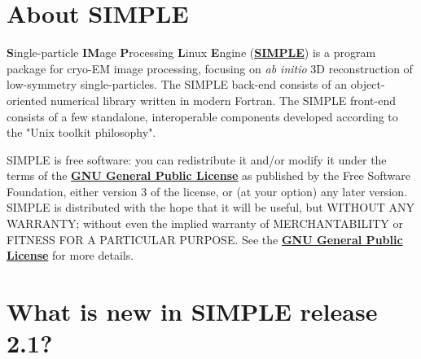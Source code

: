 \documentclass[a4paper,11pt]{article}
\begin{document}
\tableofcontents{}
\clearpage

\section{About SIMPLE}

\textbf{S}ingle-particle \textbf{IM}age \textbf{P}rocessing \textbf{L}inux \textbf{E}ngine (\href{www.simplecryoem.com}{\textbf{\textcolor{BurntOrange}{SIMPLE}}}) is a program package for cryo-EM image processing, focusing on \textit{ab initio} 3D reconstruction of low-symmetry single-particles. The SIMPLE back-end consists of an object-oriented numerical library written in modern Fortran. The SIMPLE front-end consists of a few standalone, interoperable components developed according to the "Unix toolkit philosophy".

SIMPLE is free software: you can redistribute it and/or modify it under the terms of the \href{http://www.gnu.org/copyleft/gpl.html}{\textbf{\textcolor{BurntOrange}{GNU General Public License}}} as published by the Free Software Foundation, either version 3 of the license, or (at your option) any later version. SIMPLE is distributed with the hope that it will be useful, but WITHOUT ANY WARRANTY; without even the implied warranty of MERCHANTABILITY or FITNESS FOR A PARTICULAR PURPOSE. See the \href{http://www.gnu.org/copyleft/gpl.html}{\textbf{\textcolor{BurntOrange}{GNU General Public License}}} for more details.

\section{What is new in SIMPLE release 2.1?}
\end{document}
